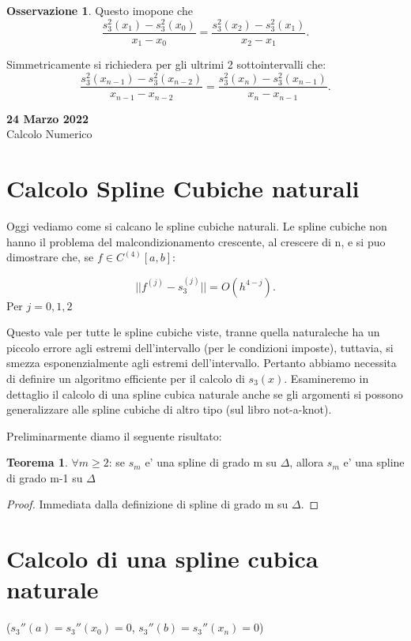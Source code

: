 \documentclass[11pt]{article}
\theoremstyle{definition}
\newtheorem{oss}{Osservazione}
\newtheorem{thm}{Teorema}[section] %
\theoremstyle{plain}
\begin{document}
\begin{oss}
Questo imopone che \[
	\frac{s_3^{2}(x_1)-s_3^{2}(x_0)}{x_1-x_0}=\frac{s_3^{2}(x_2)-s_3^{2}(x_1)}{x_2-x_1}
.\] 

Simmetricamente si richiedera per gli ultrimi 2 sottointervalli che:
\[
	\frac{s_3^{2}(x_{n-1})-s_3^{2}(x_{n-2})}{x_{n-1}-x_{n-2}}=\frac{s_3^{2}(x_n)-s_3^{2}(x_{n-1})}{x_n-x_{n-1}}
.\] 


\end{oss}

\begin{center}
{\LARGE \bf 24 Marzo 2022}\\
{\large Calcolo Numerico}\\
\end{center}

\section{Calcolo Spline Cubiche naturali}

Oggi vediamo come si calcano le spline cubiche naturali.
Le spline cubiche non hanno il problema del malcondizionamento crescente, al crescere di n, e si puo dimostrare che, se $f \in C^{(4)}[a,b]$:
 

\[
	||f^{(j)}-s_{3}^{(j)}||=O(h^{4-j})
.\] 
Per $j=0,1,2$

Questo vale per tutte le spline cubiche viste, tranne quella naturaleche ha un piccolo errore agli estremi dell'intervallo (per le condizioni imposte), tuttavia, si smezza esponenzialmente agli estremi dell'intervallo. Pertanto abbiamo necessita di definire un algoritmo efficiente per il calcolo di $s_3(x)$. Esamineremo in dettaglio il calcolo di una spline cubica naturale anche se gli argomenti si possono generalizzare alle spline cubiche di altro tipo (sul libro not-a-knot).

Preliminarmente diamo il seguente risultato:

\begin{thm}
$\forall m\ge 2$: se $s_m$ e' una spline di grado m su $\varDelta$, allora $s_m$ e' una spline di grado m-1 su $\varDelta$
\end{thm}

\begin{proof}
Immediata dalla definizione di spline di grado m su $\varDelta$.
\end{proof}

\section{Calcolo di una spline cubica naturale} 
($s_3''(a)=s_3''(x_0)=0$, $s_3''(b)=s_3''(x_n)=0$)
\end{document}
